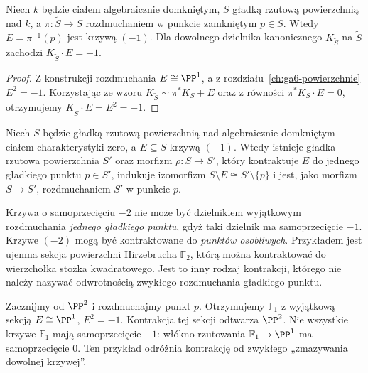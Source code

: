 \begin{stwierdzenie}
\label{st:ga8-exceptional-curve}
Niech $k$ będzie ciałem algebraicznie domkniętym,
$S$ gładką rzutową powierzchnią nad $k$, a
$\pi:\widetilde S\to S$ rozdmuchaniem w punkcie
zamkniętym $p\in S$. Wtedy
$E=\pi^{-1}(p)$ jest krzywą $(-1)$.
Dla dowolnego dzielnika kanonicznego $K_{\widetilde S}$
na $\widetilde S$ zachodzi $K_{\widetilde S}\cdot E=-1$.
\end{stwierdzenie}
\begin{proof}
Z konstrukcji rozdmuchania $E\cong\PP^1$, a z
rozdziału~\ref{ch:ga6-powierzchnie} $E^2=-1$.
Korzystając ze wzoru $K_{\widetilde S}\sim\pi^*K_S+E$
oraz z równości $\pi^*K_S\cdot E=0$, otrzymujemy
$K_{\widetilde S}\cdot E=E^2=-1$.
\end{proof}

\begin{twierdzenie}
\label{tw:ga8-castelnuovo}
Niech $S$ będzie gładką rzutową powierzchnią nad
algebraicznie domkniętym ciałem charakterystyki zero,
a $E\subseteq S$ krzywą $(-1)$. Wtedy istnieje
gładka rzutowa powierzchnia $S'$ oraz morfizm
$\rho:S\to S'$, który kontraktuje $E$ do jednego gładkiego punktu
$p\in S'$, indukuje izomorfizm $S\setminus E
\cong S'\setminus\{p\}$ i jest, jako morfizm
$S\to S'$, rozdmuchaniem $S'$ w punkcie $p$.
\end{twierdzenie}

\begin{uwaga}
Krzywa o samoprzecięciu $-2$ nie może być dzielnikiem
wyjątkowym rozdmuchania \emph{jednego gładkiego punktu},
gdyż taki dzielnik ma samoprzecięcie $-1$.
Krzywe $(-2)$ mogą być kontraktowane do \emph{punktów osobliwych}.
Przykładem jest ujemna sekcja powierzchni Hirzebrucha
$\mathbb F_2$, którą można kontraktować do wierzchołka
stożka kwadratowego. Jest to inny rodzaj kontrakcji,
którego nie należy nazywać odwrotnością zwykłego
rozdmuchania gładkiego punktu.
\end{uwaga}

\begin{przyklad}
Zacznijmy od $\PP^2$ i rozdmuchajmy punkt $p$.
Otrzymujemy $\mathbb F_1$ z wyjątkową sekcją
$E\cong\PP^1$, $E^2=-1$. Kontrakcja tej sekcji
odtwarza $\PP^2$. Nie wszystkie krzywe $\mathbb F_1$
mają samoprzecięcie $-1$: włókno rzutowania
$\mathbb F_1\to\PP^1$ ma samoprzecięcie $0$.
Ten przykład odróżnia kontrakcję od zwykłego
„zmazywania dowolnej krzywej”.
\end{przyklad}


